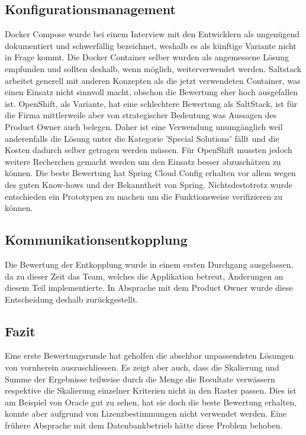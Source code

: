 \subsection{Konfigurationsmanagement}

Docker Compose wurde bei einem Interview mit den Entwicklern als ungenügend dokumentiert und schwerfällig bezeichnet, weshalb es als künftige Variante nicht in Frage kommt. Die Docker Container selber wurden als angemessene Lösung empfunden und sollten deshalb, wenn möglich, weiterverwendet werden. Saltstack arbeitet generell mit anderen Konzepten als die jetzt verwendeten Container, was einen Einsatz nicht sinnvoll macht, obschon die Bewertung eher hoch ausgefallen ist. OpenShift, als Variante, hat eine schlechtere Bewertung als SaltStack, ist für die Firma mittlerweile aber von strategischer Bedeutung was Aussagen des Product Owner auch belegen. Daher ist eine Verwendung unumgänglich weil anderenfalls die Lösung unter die Kategorie 'Special Solutions' fällt und die Kosten dadurch selber getragen werden müssen. Für OpenShift mussten jedoch weitere Recherchen gemacht werden um den Einsatz besser abzuschätzen zu können. Die beste Bewertung hat Spring Cloud Config erhalten vor allem wegen des guten Know-hows und der Bekanntheit von Spring. Nichtsdestotrotz wurde entschieden ein Prototypen zu machen um die Funktionsweise verifizieren zu können.

\subsection{Kommunikationsentkopplung}

Die Bewertung der Entkopplung wurde in einem ersten Durchgang ausgelassen, da zu dieser Zeit das Team, welches die Applikation betreut, Änderungen an diesem Teil implementierte. In Absprache mit dem Product Owner wurde diese Entscheidung deshalb zurückgestellt.

\subsection{Fazit}

Eine erste Bewertungsrunde hat geholfen die absehbar unpassendsten Lösungen von vornherein auszuschliessen. Es zeigt aber auch, dass die Skalierung und Summe der Ergebnisse teilweise durch die Menge die Resultate verwässern respektive die Skalierung einzelner Kriterien nicht in den Raster passen. Dies ist am Beispiel von Oracle gut zu sehen, hat sie doch die beste Bewertung erhalten, konnte aber aufgrund von Lizenzbestimmungen nicht verwendet werden. Eine frühere Absprache mit dem Datenbankbetrieb hätte diese Problem behoben.

